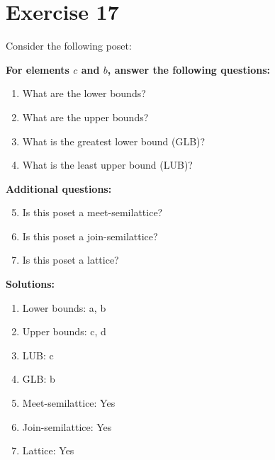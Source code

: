 \documentclass{article}
\begin{document}
\section*{Exercise 17}
Consider the following poset:
\begin{center}
\end{center}

    \textbf{For elements $c$ and $b$, answer the following questions:}
\begin{enumerate}
    \item What are the lower bounds?
    \item What are the upper bounds?
    \item What is the greatest lower bound (GLB)?
    \item What is the least upper bound (LUB)?
\end{enumerate}
    \hspace*{3ex} \textbf{Additional questions:}
\begin{enumerate}
    \setcounter{enumi}{4}
    \item Is this poset a meet-semilattice?
    \item Is this poset a join-semilattice?
    \item Is this poset a lattice?
\end{enumerate}

\textbf{Solutions:}
\begin{enumerate}
    \item Lower bounds: {a, b}
    \item Upper bounds: {c, d}
    \item LUB: c
    \item GLB: b
    \item Meet-semilattice: Yes
    \item Join-semilattice: Yes
    \item Lattice: Yes
\end{enumerate}
\newpage
\end{document}

